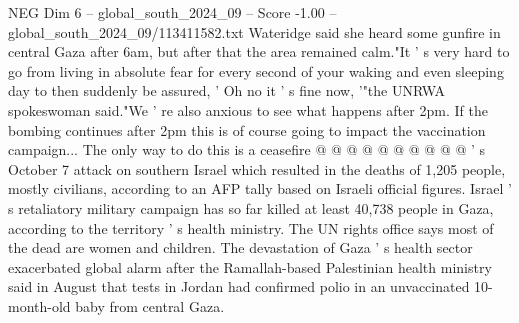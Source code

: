 \begin{textsample}{NEG Dim 6 – global\_south\_2024\_09 – Score -1.00 – global\_south\_2024\_09/113411582.txt}
Wateridge said she heard some gunfire in central Gaza after 6am, but after that the area remained calm."It ' s very hard to go from living in absolute fear for every second of your waking and even sleeping day to then suddenly be assured, ' Oh no it ' s fine now, '"the UNRWA spokeswoman said."We ' re also anxious to see what happens after 2pm.
If the bombing continues after 2pm this is of course going to impact the vaccination campaign...
The only way to do this is a ceasefire @ @ @ @ @ @ @ @ @ @ ' s October 7 attack on southern Israel which resulted in the deaths of 1,205 people, mostly civilians, according to an AFP tally based on Israeli official figures.
Israel ' s retaliatory military campaign has so far killed at least 40,738 people in Gaza, according to the territory ' s health ministry.
The UN rights office says most of the dead are women and children.
The devastation of Gaza ' s health sector exacerbated global alarm after the Ramallah-based Palestinian health ministry said in August that tests in Jordan had confirmed polio in an unvaccinated 10-month-old baby from central Gaza.

\end{textsample}
